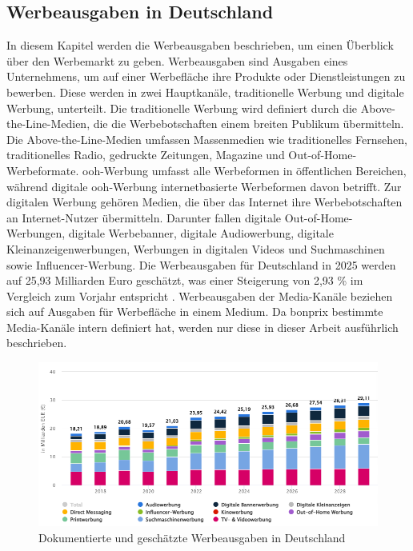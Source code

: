 \subsection{Werbeausgaben in Deutschland}
\label{werbeausgaben}
In diesem Kapitel werden die Werbeausgaben beschrieben, um einen Überblick über den Werbemarkt zu geben. Werbeausgaben sind Ausgaben eines Unternehmens, um auf einer Werbefläche ihre Produkte oder Dienstleistungen zu bewerben. Diese werden in zwei Hauptkanäle, traditionelle Werbung und digitale Werbung, unterteilt. Die traditionelle Werbung wird definiert durch die Above-the-Line-Medien, die die Werbebotschaften einem breiten Publikum übermitteln. Die Above-the-Line-Medien umfassen Massenmedien wie traditionelles Fernsehen, traditionelles Radio, gedruckte Zeitungen, Magazine und Out-of-Home-Werbeformate. \ac{ooh}-Werbung umfasst alle Werbeformen in öffentlichen Bereichen, während digitale \ac{ooh}-Werbung internetbasierte Werbeformen davon betrifft. Zur digitalen Werbung gehören Medien, die über das Internet ihre Werbebotschaften an Internet-Nutzer übermitteln. Darunter fallen digitale Out-of-Home-Werbungen, digitale Werbebanner, digitale Audiowerbung, digitale Kleinanzeigenwerbungen, Werbungen in digitalen Videos und Suchmaschinen sowie Influencer-Werbung. Die Werbeausgaben für Deutschland in 2025 werden auf 25,93 Milliarden Euro geschätzt, was einer Steigerung von 2,93 \% im Vergleich zum Vorjahr entspricht \cite{statista_werbung}. Werbeausgaben der Media-Kanäle beziehen sich auf Ausgaben für Werbefläche in einem Medium. Da bonprix bestimmte Media-Kanäle intern definiert hat, werden nur diese in dieser Arbeit ausführlich beschrieben.
\begin{figure}[H]
    \centering
    \includegraphics[width=0.90\linewidth]{images/werbede.png}
    \caption{Dokumentierte und geschätzte Werbeausgaben in Deutschland \cite{statista_werbung}}
    \label{fig:statistawerbungde}
\end{figure}
\noindent
